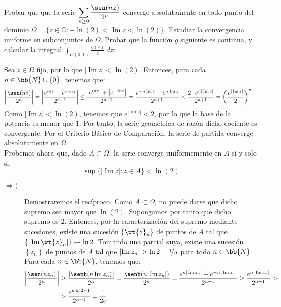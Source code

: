 \documentclass[12pt]{article}
\renewcommand{\Im}{\operatorname{Im}}
\begin{document}
    \begin{ejercicio}[4 puntos]
        Probar que que la serie $\displaystyle \sum_{n\geq 0} \frac{\sen(nz)}{2^n}$ converge absolutamente en todo punto del dominio $\Omega=\{z \in \mathbb{C} : -\ln(2) < \Im z < \ln(2)\}$. Estudiar la convergencia uniforme en subconjuntos de $\Omega$. Probar que la función $g$ siguiente es continua, y calcular la integral $\displaystyle \int_{C(0,1)} \frac{g(z)}{z}\ dz$:

        Sea $z\in \Omega$ fijo, por lo que $|\Im z|<\ln(2)$. Entonces, para cada $n\in \bb{N}\cup \{0\}$, tenemos que:
        \begin{align*}
            \left|\dfrac{\sen(nz)}{2^n}\right| &= \left|\dfrac{e^{inz}-e^{-inz}}{2^{n+1}}\right|\leq 
            \dfrac{\left|e^{inz}\right|+\left|e^{-inz}\right|}{2^{n+1}} = \dfrac{e^{-n\Im z}+e^{n\Im z}}{2^{n+1}}< \dfrac{2\cdot e^{n|\Im z|}}{2^{n+1}} = \left(\dfrac{e^{|\Im z|}}{2}\right)^n
        \end{align*}
        Como $|\Im z|<\ln(2)$, tenemos que $e^{|\Im z|}<2$, por lo que la base de la potencia es menor que 1. Por tanto, la serie geométrica de razón dicho cociente es convergente. Por el Criterio Básico de Comparación, la serie de partida converge absolutamente en $\Omega$.\\

        Probemos ahora que, dado $A\subset \Omega$, la serie converge uniformemente en $A$ si y solo si:
        \begin{equation*}
            \sup\{|\Im z| : z\in A\} < \ln(2)
        \end{equation*}
        \begin{description}
            \item[$\Longrightarrow)$] Demostraremos el recíproco. Como $A\subset \Omega$, no puede darse que dicho supremo sea mayor que $\ln(2)$. Supongamos por tanto que dicho supremo es $2$. Entonces, por la caracterización del supremo mediante sucesiones, existe una sucesión $\left\{\wt{z}_n\right\}$ de puntos de $A$ tal que $\left\{|\Im \wt{z}_n|\right\}\to \ln 2$. Tomando una parcial suya, existe una sucesión $\left\{z_n\right\}$ de puntos de $A$ tal que $\left|\Im z_n\right|>\ln 2 - \nicefrac{1}{n}$ para todo $n\in \bb{N}$.\\
            
            Para cada $n\in \bb{N}$, tenemos que:
            \begin{align*}
                \left|\dfrac{\sen(nz_n)}{2^n}\right| &\geq \dfrac{\left|\senh(n\Im z_n)\right|}{2^{n}}
                = \dfrac{\senh(n|\Im z_n|)}{2^{n}}
                = \dfrac{e^{n|\Im z_n|}-e^{-n|\Im z_n|}}{2^{n+1}} \geq \dfrac{e^{n|\Im z_n|}}{2^{n+1}}
                > \\
                &> \dfrac{e^{n\ln 2 -1}}{2^{n+1}}
                = \dfrac{1}{2e}
            \end{align*}


\end{description}
\end{ejercicio}
\end{document}

